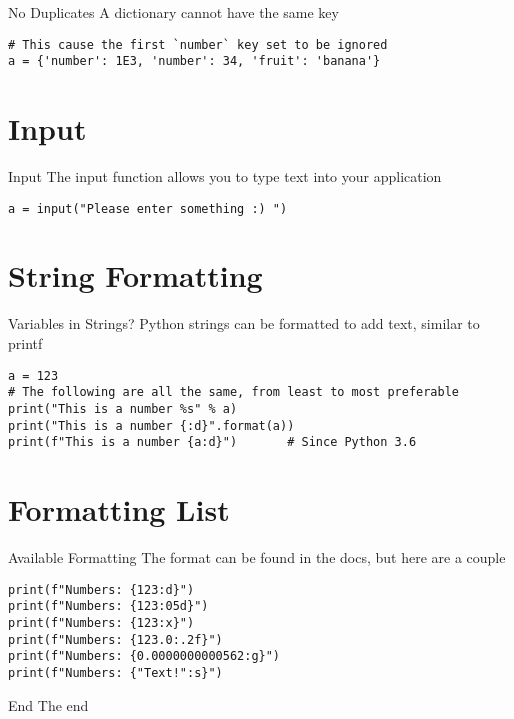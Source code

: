 \documentclass[10pt]{beamer}
\begin{document}
\begin{frame}[containsverbatim]{No Duplicates}
    A dictionary cannot have the same key
    \begin{verbatim}
# This cause the first `number` key set to be ignored
a = {'number': 1E3, 'number': 34, 'fruit': 'banana'}
    \end{verbatim}
\end{frame}

\section{Input}

\begin{frame}[containsverbatim]{Input}
    The input function allows you to type text into your application
    \begin{verbatim}
a = input("Please enter something :) ")
    \end{verbatim}
\end{frame}

\section{String Formatting}
\begin{frame}[containsverbatim]{Variables in Strings?}
    Python strings can be formatted to add text, similar to printf
    \begin{verbatim}
a = 123
# The following are all the same, from least to most preferable
print("This is a number %s" % a)
print("This is a number {:d}".format(a))
print(f"This is a number {a:d}")       # Since Python 3.6
    \end{verbatim}
\end{frame}

\section{Formatting List}
\begin{frame}[containsverbatim]{Available Formatting}
    The format can be found in the docs, but here are a couple
    \begin{verbatim}
print(f"Numbers: {123:d}")
print(f"Numbers: {123:05d}")
print(f"Numbers: {123:x}")
print(f"Numbers: {123.0:.2f}")
print(f"Numbers: {0.0000000000562:g}")
print(f"Numbers: {"Text!":s}")
    \end{verbatim}
\end{frame}

\begin{frame}[standout]{End}
  The end
\end{frame}
\end{document}
